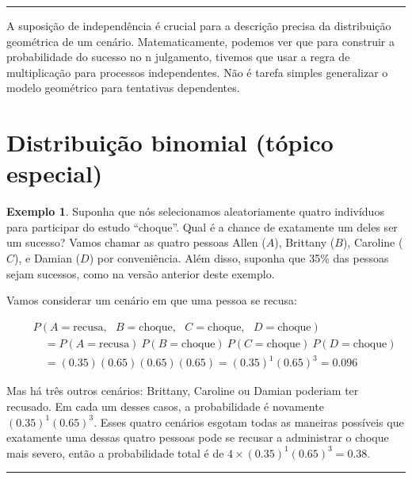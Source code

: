 \documentclass[
]{book}
\theoremstyle{definition}
\theoremstyle{definition}
\newtheorem{example}{Exemplo}[chapter]
\theoremstyle{definition}
\theoremstyle{definition}
\theoremstyle{remark}
\begin{document}
\begin{center}\rule{0.5\linewidth}{0.5pt}\end{center}

A suposição de independência é crucial para a descrição precisa da distribuição geométrica de um cenário. Matematicamente, podemos ver que para construir a probabilidade do sucesso no n julgamento, tivemos que usar a regra de multiplicação para processos independentes. Não é tarefa simples generalizar o modelo geométrico para tentativas dependentes.

\hypertarget{binomialDistribution}{%
\section{Distribuição binomial (tópico especial)}\label{binomialDistribution}}

\begin{example}
\protect\hypertarget{exm:binex}{}{\label{exm:binex} }Suponha que nós selecionamos aleatoriamente quatro indivíduos para participar do estudo ``choque''. Qual é a chance de exatamente um deles ser um sucesso? Vamos chamar as quatro pessoas Allen (\(A\)), Brittany (\(B\)), Caroline (\(C\)), e Damian (\(D\)) por conveniência. Além disso, suponha que 35\% das pessoas sejam sucessos, como na versão anterior deste exemplo.
\end{example}

Vamos considerar um cenário em que uma pessoa se recusa:

\begin{eqnarray*}
&&P(A=\text{recusa},\text{ }B=\text{choque},\text{ }C=\text{choque},\text{ }D=\text{choque}) \\
 &&\quad =  P(A=\text{recusa})\ P(B=\text{choque})\ P(C=\text{choque})\ P(D=\text{choque}) \\
 &&\quad =  (0.35)  (0.65)  (0.65)  (0.65) = (0.35)^1 (0.65)^3 = 0.096
\end{eqnarray*}

Mas há três outros cenários: Brittany, Caroline ou Damian poderiam ter recusado. Em cada um desses casos, a probabilidade é novamente \((0.35)^1(0.65)^3\). Esses quatro cenários esgotam todas as maneiras possíveis que exatamente uma dessas quatro pessoas pode se recusar a administrar o choque mais severo, então a probabilidade total é de \(4\times(0.35)^1(0.65)^3 = 0.38\).

\begin{center}\rule{0.5\linewidth}{0.5pt}\end{center}
\end{document}
